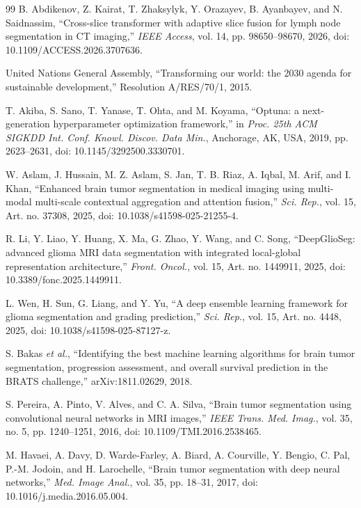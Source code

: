 \begin{thebibliography}{99}
B. Abdikenov, Z. Kairat, T. Zhaksylyk, Y. Orazayev, B. Ayanbayev, and N. Saidnassim,
``Cross-slice transformer with adaptive slice fusion for lymph node segmentation in CT imaging,''
\textit{IEEE Access}, vol. 14, pp. 98650--98670, 2026, doi: 10.1109/ACCESS.2026.3707636.

United Nations General Assembly,
``Transforming our world: the 2030 agenda for sustainable development,''
Resolution A/RES/70/1, 2015.

T. Akiba, S. Sano, T. Yanase, T. Ohta, and M. Koyama,
``Optuna: a next-generation hyperparameter optimization framework,''
in \textit{Proc. 25th ACM SIGKDD Int. Conf. Knowl. Discov. Data Min.},
Anchorage, AK, USA, 2019, pp. 2623--2631, doi: 10.1145/3292500.3330701.

W. Aslam, J. Hussain, M. Z. Aslam, S. Jan, T. B. Riaz, A. Iqbal, M. Arif, and I. Khan,
``Enhanced brain tumor segmentation in medical imaging using multi-modal multi-scale contextual aggregation and attention fusion,''
\textit{Sci. Rep.}, vol. 15, Art. no. 37308, 2025, doi: 10.1038/s41598-025-21255-4.

R. Li, Y. Liao, Y. Huang, X. Ma, G. Zhao, Y. Wang, and C. Song,
``DeepGlioSeg: advanced glioma MRI data segmentation with integrated local-global representation architecture,''
\textit{Front. Oncol.}, vol. 15, Art. no. 1449911, 2025, doi: 10.3389/fonc.2025.1449911.

L. Wen, H. Sun, G. Liang, and Y. Yu,
``A deep ensemble learning framework for glioma segmentation and grading prediction,''
\textit{Sci. Rep.}, vol. 15, Art. no. 4448, 2025, doi: 10.1038/s41598-025-87127-z.

S. Bakas \textit{et al.},
``Identifying the best machine learning algorithms for brain tumor segmentation, progression assessment, and overall survival prediction in the BRATS challenge,''
arXiv:1811.02629, 2018.

S. Pereira, A. Pinto, V. Alves, and C. A. Silva,
``Brain tumor segmentation using convolutional neural networks in MRI images,''
\textit{IEEE Trans. Med. Imag.}, vol. 35, no. 5, pp. 1240--1251, 2016, doi: 10.1109/TMI.2016.2538465.

M. Havaei, A. Davy, D. Warde-Farley, A. Biard, A. Courville, Y. Bengio, C. Pal, P.-M. Jodoin, and H. Larochelle,
``Brain tumor segmentation with deep neural networks,''
\textit{Med. Image Anal.}, vol. 35, pp. 18--31, 2017, doi: 10.1016/j.media.2016.05.004.


\end{thebibliography}
